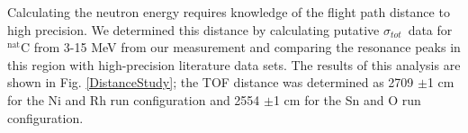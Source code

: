 \documentclass[twocolumn,secnumarabic,amssymb, nobibnotes, aps, prl,
superscriptaddress, nobalancelastpage]{revtex4}
\newcommand{\tot}{\ensuremath{\sigma_{tot}}}
\begin{document}


Calculating the neutron energy requires knowledge of the flight path
distance to high precision. We determined this distance by calculating 
putative \tot\ data for $^{\text{nat}}$C from 3-15 MeV from our measurement and 
comparing the resonance peaks in this region with high-precision literature data
sets. The results of this analysis are shown in Fig. \ref{DistanceStudy};
the TOF distance was determined as 2709 $\pm$1 cm for the Ni and Rh
run configuration and 2554 $\pm$1 cm for the Sn and O run configuration.
\end{document}

